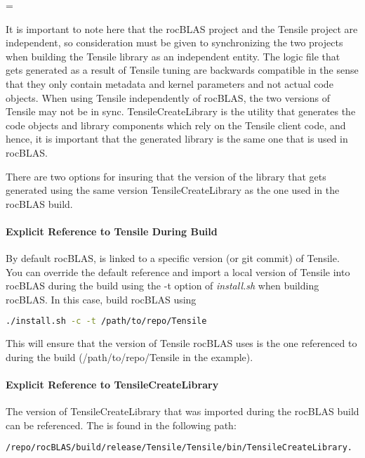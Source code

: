 \documentclass[]{article}
\newenvironment{warning}
{\par\begin{mdframed}[linewidth=2pt,linecolor=red]
		\begin{list}{}{\leftmargin=1cm
				\labelwidth=\leftmargin}\item[\Large\ding{43}]}
		{\end{list}\end{mdframed}\par}
\begin{document}
\begin{warning}
	It is important to note here that the rocBLAS project and the Tensile project are independent, so consideration must be given to synchronizing the two projects when building the Tensile library as an independent entity. The logic file that gets generated as a result of Tensile tuning are backwards compatible in the sense that they only contain metadata and kernel parameters and not actual code objects. When using Tensile independently of rocBLAS, the two versions of Tensile may not be in sync. TensileCreateLibrary is the utility that generates the code objects and library components which rely on the Tensile client code, and hence, it is important that the generated library is the same one that is used in rocBLAS.
\end{warning}

There are two options for insuring that the version of the library that gets generated using the same version TensileCreateLibrary as the one used in the rocBLAS build.

\paragraph{Explicit Reference to Tensile During Build}
By default rocBLAS, is linked to a specific version (or git commit) of Tensile. You can override the default reference and import a local version of Tensile into rocBLAS during the build using the -t option of \emph{install.sh} when building rocBLAS. In this case, build rocBLAS using

\begin{lstlisting}[language=bash]
./install.sh -c -t /path/to/repo/Tensile
\end{lstlisting}

\noindent
This will ensure that the version of Tensile rocBLAS uses is the one referenced to during the build (/path/to/repo/Tensile in the example).

\paragraph{Explicit Reference to TensileCreateLibrary}

The version of TensileCreateLibrary that was imported during the rocBLAS build can be referenced. The is found in the following path:

\begin{lstlisting}[language=bash]
/repo/rocBLAS/build/release/Tensile/Tensile/bin/TensileCreateLibrary.
\end{lstlisting}
\end{document}
